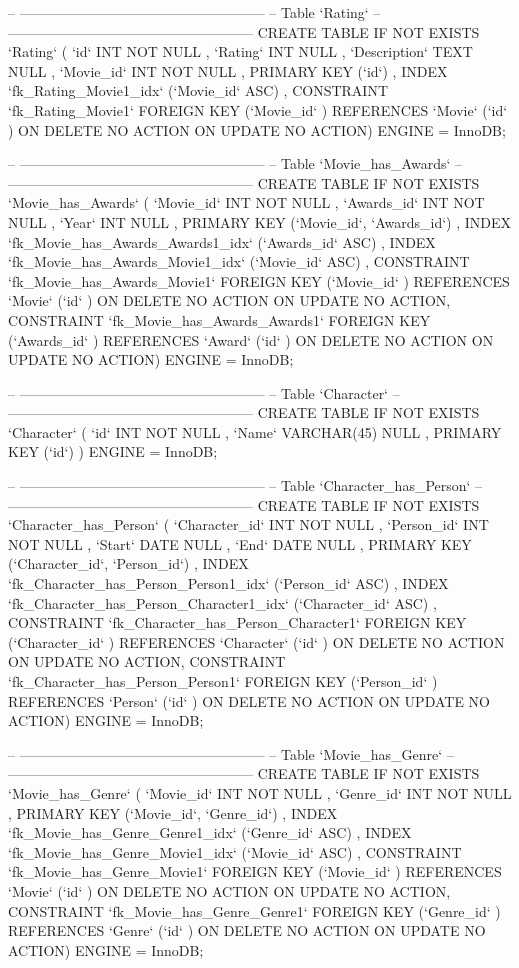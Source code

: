 \begin{spverbatim}
-- -----------------------------------------------------
-- Table `Rating`
-- -----------------------------------------------------
CREATE  TABLE IF NOT EXISTS `Rating` (
  `id` INT NOT NULL ,
  `Rating` INT NULL ,
  `Description` TEXT NULL ,
  `Movie_id` INT NOT NULL ,
  PRIMARY KEY (`id`) ,
  INDEX `fk_Rating_Movie1_idx` (`Movie_id` ASC) ,
  CONSTRAINT `fk_Rating_Movie1`
    FOREIGN KEY (`Movie_id` )
    REFERENCES `Movie` (`id` )
    ON DELETE NO ACTION
    ON UPDATE NO ACTION)
ENGINE = InnoDB;


-- -----------------------------------------------------
-- Table `Movie_has_Awards`
-- -----------------------------------------------------
CREATE  TABLE IF NOT EXISTS `Movie_has_Awards` (
  `Movie_id` INT NOT NULL ,
  `Awards_id` INT NOT NULL ,
  `Year` INT NULL ,
  PRIMARY KEY (`Movie_id`, `Awards_id`) ,
  INDEX `fk_Movie_has_Awards_Awards1_idx` (`Awards_id` ASC) ,
  INDEX `fk_Movie_has_Awards_Movie1_idx` (`Movie_id` ASC) ,
  CONSTRAINT `fk_Movie_has_Awards_Movie1`
    FOREIGN KEY (`Movie_id` )
    REFERENCES `Movie` (`id` )
    ON DELETE NO ACTION
    ON UPDATE NO ACTION,
  CONSTRAINT `fk_Movie_has_Awards_Awards1`
    FOREIGN KEY (`Awards_id` )
    REFERENCES `Award` (`id` )
    ON DELETE NO ACTION
    ON UPDATE NO ACTION)
ENGINE = InnoDB;


-- -----------------------------------------------------
-- Table `Character`
-- -----------------------------------------------------
CREATE  TABLE IF NOT EXISTS `Character` (
  `id` INT NOT NULL ,
  `Name` VARCHAR(45) NULL ,
  PRIMARY KEY (`id`) )
ENGINE = InnoDB;


-- -----------------------------------------------------
-- Table `Character_has_Person`
-- -----------------------------------------------------
CREATE  TABLE IF NOT EXISTS `Character_has_Person` (
  `Character_id` INT NOT NULL ,
  `Person_id` INT NOT NULL ,
  `Start` DATE NULL ,
  `End` DATE NULL ,
  PRIMARY KEY (`Character_id`, `Person_id`) ,
  INDEX `fk_Character_has_Person_Person1_idx` (`Person_id` ASC) ,
  INDEX `fk_Character_has_Person_Character1_idx` (`Character_id` ASC) ,
  CONSTRAINT `fk_Character_has_Person_Character1`
    FOREIGN KEY (`Character_id` )
    REFERENCES `Character` (`id` )
    ON DELETE NO ACTION
    ON UPDATE NO ACTION,
  CONSTRAINT `fk_Character_has_Person_Person1`
    FOREIGN KEY (`Person_id` )
    REFERENCES `Person` (`id` )
    ON DELETE NO ACTION
    ON UPDATE NO ACTION)
ENGINE = InnoDB;


-- -----------------------------------------------------
-- Table `Movie_has_Genre`
-- -----------------------------------------------------
CREATE  TABLE IF NOT EXISTS `Movie_has_Genre` (
  `Movie_id` INT NOT NULL ,
  `Genre_id` INT NOT NULL ,
  PRIMARY KEY (`Movie_id`, `Genre_id`) ,
  INDEX `fk_Movie_has_Genre_Genre1_idx` (`Genre_id` ASC) ,
  INDEX `fk_Movie_has_Genre_Movie1_idx` (`Movie_id` ASC) ,
  CONSTRAINT `fk_Movie_has_Genre_Movie1`
    FOREIGN KEY (`Movie_id` )
    REFERENCES `Movie` (`id` )
    ON DELETE NO ACTION
    ON UPDATE NO ACTION,
  CONSTRAINT `fk_Movie_has_Genre_Genre1`
    FOREIGN KEY (`Genre_id` )
    REFERENCES `Genre` (`id` )
    ON DELETE NO ACTION
    ON UPDATE NO ACTION)
ENGINE = InnoDB;



\end{spverbatim}
